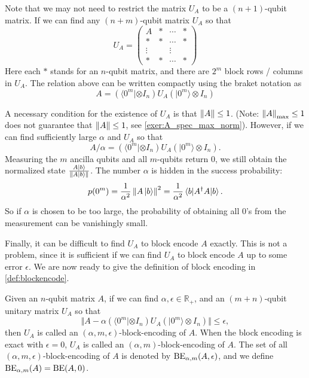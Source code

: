 Note that we may not need to restrict the matrix $U_A$ to be a $(n+1)$-qubit matrix. If we can find any $(n+m)$-qubit matrix $U_A$ so that
\begin{equation}
U_A=\begin{pmatrix}
A & * & \cdots & *\\
* & * & \cdots & *\\
\vdots & & \vdots\\
* & * & \cdots & *
\end{pmatrix}
\end{equation}
Here each $*$ stands for an $n$-qubit matrix, and there are $2^m$ block rows / columns in $U_A$. The relation above can be written compactly using the braket notation as
\begin{equation}
A=\left(\langle 0^m | \otimes I_n\right) U_A \left( | 0^m \rangle \otimes I_n
\right)
\end{equation}

A necessary condition for the existence of $U_A$ is that $\left\lVert A\right\rVert\le 1$. (Note: $\left\lVert A\right\rVert_{\max}\le 1$ does not guarantee that $\left\lVert A\right\rVert\le 1$, see \cref{exer:A_spec_max_norm}).
However, if we can find sufficiently large $\alpha$ and $U_A$ so that
\begin{equation}
A/\alpha=\left(\langle 0^m | \otimes I_n\right) U_A \left( | 0^m \rangle \otimes I_n
\right).
\end{equation}
Measuring the $m$ ancilla qubits and all $m$-qubits return $0$, we still obtain the normalized state $\frac{A\ket{b}}{\left\lVert A\ket{b}\right\rVert}$.
The number $\alpha$ is hidden in the success probability:
\begin{equation}
p(0^m)=\frac{1}{\alpha^2}\left\lVert A\ket{b}\right\rVert^2=\frac{1}{\alpha^2}\braket{b|A^{\dag}A|b}.
\end{equation}
So if $\alpha$ is chosen to be too large, the probability of obtaining all $0$'s from the measurement can be vanishingly small.

Finally, it can be difficult to find $U_A$ to block encode $A$ exactly. This is not a problem, since it is sufficient if we can find $U_A$ to block encode $A$ up to some error $\epsilon$. We are now ready to give the definition of block encoding in \cref{def:blockencode}.
 



\begin{defn} Given an $n$-qubit matrix $A$, if we can find $\alpha, \epsilon \in \mathbb{R}_+$, and an $(m+n)$-qubit unitary matrix $U_A$ so that 
\begin{equation}
\Vert A - \alpha \left(\langle 0^m | \otimes I_n\right) U_A \left( | 0^m \rangle \otimes I_n \right) \Vert \leq \epsilon,
\end{equation}
then $U_A$ is called an $(\alpha, m, \epsilon)$-block-encoding of $A$.
When the block encoding is exact with $\epsilon=0$, $U_A$ is called an $(\alpha, m)$-block-encoding of $A$. The set of all $(\alpha, m, \epsilon)$-block-encoding of $A$ is denoted by $\operatorname{BE}_{\alpha,m}(A,\epsilon)$, and we define $\operatorname{BE}_{\alpha,m}(A)=\operatorname{BE}(A,0)$.
\label{def:blockencode}
\end{defn}


